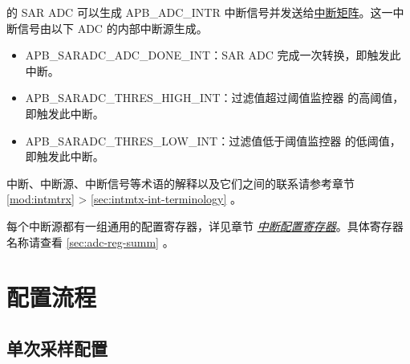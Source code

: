 \documentclass[main\_\_CN.tex]{subfiles}
\begin{document}
\chipname{} 的 SAR ADC 可以生成 APB\_ADC\_INTR 中断信号并发送给\hyperref[mod:intmtrx]{中断矩阵}。这一中断信号由以下 ADC 的内部中断源生成。

\begin{itemize}
   \item \label{int:SARADCDONEINT1} APB\_SARADC\_ADC\_DONE\_INT：SAR ADC 完成一次转换，即触发此中断。
   \item \label{int:APBSARADCTHRESxHIGHINT} APB\_SARADC\_THRES\_HIGH\_INT：过滤值超过阈值监控器  的高阈值，即触发此中断。
   \item \label{int:APBSARADCTHRESxLOWINT} APB\_SARADC\_THRES\_LOW\_INT：过滤值低于阈值监控器  的低阈值，即触发此中断。
\end{itemize}

\begin{tiplisting}
中断、中断源、中断信号等术语的解释以及它们之间的联系请参考章节 \ref{mod:intmtrx} \textit{} > \ref{sec:intmtx-int-terminology} \textit{}。
\end{tiplisting}

每个中断源都有一组通用的配置寄存器，详见章节 \hyperref[interrupt-config-registers]{\textit{中断配置寄存器}}。具体寄存器名称请查看 \ref{sec:adc-reg-summ} \textit{}。



\section{配置流程}
\label{sec:adc_programming_procedure}

\subsection{单次采样配置}
\end{document}
